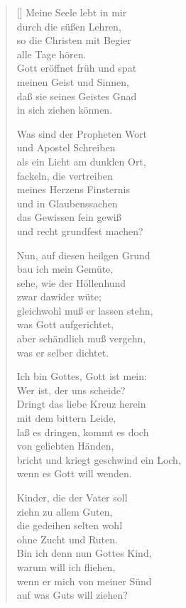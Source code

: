 \begin{multicols}{2}
\begin{verse}[\versewidth]
 Meine Seele lebt in mir\\
durch die süßen Lehren,\\
so die Christen mit Begier\\
alle Tage hören.\\
Gott eröffnet früh und spat\\
meinen Geist und Sinnen,\\
daß sie seines Geistes Gnad\\
in sich ziehen können.

 Was sind der Propheten Wort\\
und Apostel Schreiben\\
als ein Licht am dunklen Ort,\\
fackeln, die vertreiben\\
meines Herzens Finsternis\\
und in Glaubenssachen\\
das Gewissen fein gewiß\\
und recht grundfest machen?

 Nun, auf diesen heilgen Grund\\
bau ich mein Gemüte,\\
sehe, wie der Höllenhund\\
zwar dawider wüte;\\
gleichwohl muß er lassen stehn,\\
was Gott aufgerichtet,\\
aber schändlich muß vergehn,\\
was er selber dichtet.

 Ich bin Gottes, Gott ist mein:\\
Wer ist, der uns scheide?\\
Dringt das liebe Kreuz herein\\
mit dem bittern Leide,\\
laß es dringen, kommt es doch\\
von geliebten Händen,\\
bricht und kriegt geschwind ein Loch,\\
wenn es Gott will wenden.

 Kinder, die der Vater soll\\
ziehn zu allem Guten,\\
die gedeihen selten wohl\\
ohne Zucht und Ruten.\\
Bin ich denn nun Gottes Kind,\\
warum will ich fliehen,\\
wenn er mich von meiner Sünd\\
auf was Guts will ziehen?


\end{verse}
\end{multicols}

